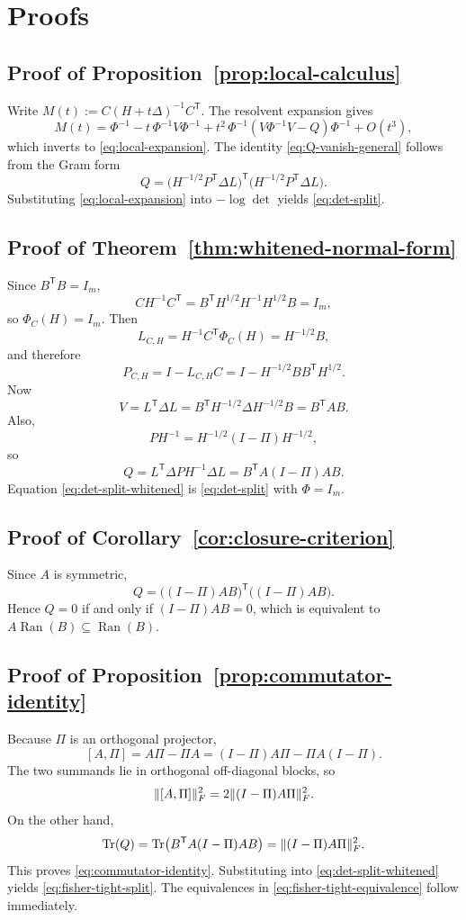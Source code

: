 \documentclass[11pt,a4paper]{article}
\numberwithin{equation}{section}
\DeclareMathOperator{\Tr}{Tr}
\DeclareMathOperator{\Ran}{Ran}
\DeclarePairedDelimiter{\norm}{\lVert}{\rVert}
\theoremstyle{thmcompact}
\theoremstyle{remark}
\begin{document}
\newpage

\appendix
\section{Proofs}

\subsection*{Proof of Proposition~\ref{prop:local-calculus}}
Write $M(t):=C(H+t\Delta)^{-1}C^{\mathsf T}$. The resolvent expansion gives
\[
M(t)=\Phi^{-1}-t\,\Phi^{-1}V\Phi^{-1}+t^2\,\Phi^{-1}(V\Phi^{-1}V-Q)\Phi^{-1}+O(t^3),
\]
which inverts to \eqref{eq:local-expansion}. The identity \eqref{eq:Q-vanish-general} follows from the Gram form
\[
Q=
\bigl(H^{-1/2}P^{\mathsf T}\Delta L\bigr)^{\mathsf T}
\bigl(H^{-1/2}P^{\mathsf T}\Delta L\bigr).
\]
Substituting \eqref{eq:local-expansion} into $-\log\det$ yields \eqref{eq:det-split}.

\subsection*{Proof of Theorem~\ref{thm:whitened-normal-form}}
Since $B^{\mathsf T}B=I_m$,
\[
CH^{-1}C^{\mathsf T}=B^{\mathsf T}H^{1/2}H^{-1}H^{1/2}B=I_m,
\]
so $\Phi_C(H)=I_m$. Then
\[
L_{C,H}=H^{-1}C^{\mathsf T}\Phi_C(H)=H^{-1/2}B,
\]
and therefore
\[
P_{C,H}=I-L_{C,H}C=I-H^{-1/2}BB^{\mathsf T}H^{1/2}.
\]
Now
\[
V=L^{\mathsf T}\Delta L=B^{\mathsf T}H^{-1/2}\Delta H^{-1/2}B=B^{\mathsf T}AB.
\]
Also,
\[
PH^{-1}=H^{-1/2}(I-\Pi)H^{-1/2},
\]
so
\[
Q=L^{\mathsf T}\Delta PH^{-1}\Delta L
=B^{\mathsf T}A(I-\Pi)AB.
\]
Equation \eqref{eq:det-split-whitened} is \eqref{eq:det-split} with $\Phi=I_m$.

\subsection*{Proof of Corollary~\ref{cor:closure-criterion}}
Since $A$ is symmetric,
\[
Q=
\bigl((I-\Pi)AB\bigr)^{\mathsf T}
\bigl((I-\Pi)AB\bigr).
\]
Hence $Q=0$ if and only if $(I-\Pi)AB=0$, which is equivalent to $A\Ran(B)\subseteq\Ran(B)$.

\subsection*{Proof of Proposition~\ref{prop:commutator-identity}}
Because $\Pi$ is an orthogonal projector,
\[
[A,\Pi]=A\Pi-\Pi A=(I-\Pi)A\Pi-\Pi A(I-\Pi).
\]
The two summands lie in orthogonal off-diagonal blocks, so
\[
\norm{[A,\Pi]}_F^2=2\norm{(I-\Pi)A\Pi}_F^2.
\]
On the other hand,
\[
\Tr(Q)=\Tr\bigl(B^{\mathsf T}A(I-\Pi)AB\bigr)=\norm{(I-\Pi)A\Pi}_F^2.
\]
This proves \eqref{eq:commutator-identity}. Substituting into \eqref{eq:det-split-whitened} yields \eqref{eq:fisher-tight-split}. The equivalences in \eqref{eq:fisher-tight-equivalence} follow immediately.
\end{document}
